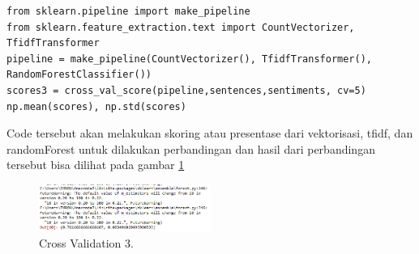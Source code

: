 \begin{enumerate}
\begin{verbatim}
from sklearn.pipeline import make_pipeline
from sklearn.feature_extraction.text import CountVectorizer, TfidfTransformer
pipeline = make_pipeline(CountVectorizer(), TfidfTransformer(), RandomForestClassifier())
scores3 = cross_val_score(pipeline,sentences,sentiments, cv=5)
np.mean(scores), np.std(scores)
\end{verbatim}
Code tersebut akan melakukan skoring atau presentase dari vektorisasi, tfidf, dan randomForest untuk dilakukan perbandingan dan hasil dari perbandingan tersebut bisa dilihat pada gambar \ref{sim18}
		\begin{figure}[!htbp]
		\centerline{\includegraphics[width=0.5\textwidth]{figures/im/sim18.png}}
		\caption{Cross Validation 3.}
		\label{sim18}
		\end{figure}
\end{enumerate}

